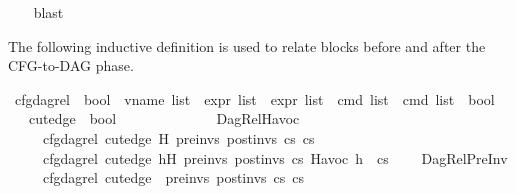 \begin{isabellebody}
\ \ \isamarkupfalse%
\ blast%
\endisatagproof
{\isafoldproof}%
%
\isadelimproof
\isanewline
%
\endisadelimproof
\isanewline
{}\isamarkupfalse%
%
\isadelimdocument
%
\endisadelimdocument
%
\isatagdocument
%
\isamarkuptrue%
%
\endisatagdocument
{\isafolddocument}%
%
\isadelimdocument
%
\endisadelimdocument
%
\begin{isamarkuptext}%
The following inductive definition is used to relate blocks before and after the CFG-to-DAG
phase.%
\end{isamarkuptext}\isamarkuptrue%
\isamarkupfalse%
\ cfg{\isacharunderscore}{\kern0pt}dag{\isacharunderscore}{\kern0pt}rel\ {\isacharcolon}{\kern0pt}{\isacharcolon}{\kern0pt}\ {\isachardoublequoteopen}bool\ {\isasymRightarrow}\ vname\ list\ {\isasymRightarrow}\ expr\ list\ {\isasymRightarrow}\ expr\ list\ {\isasymRightarrow}\ cmd\ list\ {\isasymRightarrow}\ cmd\ list\ {\isasymRightarrow}\ bool{\isachardoublequoteclose}\isanewline
\ \ \ {\isachardoublequoteopen}cut{\isacharunderscore}{\kern0pt}edge{\isachardoublequoteclose}\ {\isacharcolon}{\kern0pt}{\isacharcolon}{\kern0pt}\ bool\isanewline
\ \ \ \ \ \ \ \ \isanewline
\ \ \ \ \ DagRel{\isacharunderscore}{\kern0pt}Havoc{\isacharcolon}{\kern0pt}\isanewline
\ \ \ \ \ {\isachardoublequoteopen}{\isasymlbrakk}cfg{\isacharunderscore}{\kern0pt}dag{\isacharunderscore}{\kern0pt}rel\ cut{\isacharunderscore}{\kern0pt}edge\ H\ pre{\isacharunderscore}{\kern0pt}invs\ post{\isacharunderscore}{\kern0pt}invs\ cs{}\ cs{}{\isasymrbrakk}\ {\isasymLongrightarrow}\isanewline
\ \ \ \ \ cfg{\isacharunderscore}{\kern0pt}dag{\isacharunderscore}{\kern0pt}rel\ cut{\isacharunderscore}{\kern0pt}edge\ {\isacharparenleft}{\kern0pt}h{\isacharhash}{\kern0pt}H{\isacharparenright}{\kern0pt}\ pre{\isacharunderscore}{\kern0pt}invs\ post{\isacharunderscore}{\kern0pt}invs\ cs{}\ {\isacharparenleft}{\kern0pt}Havoc\ h\ {\isacharhash}{\kern0pt}\ cs{}{\isacharparenright}{\kern0pt}{\isachardoublequoteclose}\isanewline
\ \ \ {\isacharbar}{\kern0pt}\ DagRel{\isacharunderscore}{\kern0pt}PreInv{\isacharcolon}{\kern0pt}\isanewline
\ \ \ \ \ {\isachardoublequoteopen}{\isasymlbrakk}cfg{\isacharunderscore}{\kern0pt}dag{\isacharunderscore}{\kern0pt}rel\ cut{\isacharunderscore}{\kern0pt}edge\ {\isacharbrackleft}{\kern0pt}{\isacharbrackright}{\kern0pt}\ pre{\isacharunderscore}{\kern0pt}invs\ post{\isacharunderscore}{\kern0pt}invs\ cs{}\ cs{}{\isasymrbrakk}\ {\isasymLongrightarrow}\isanewline

\end{isabellebody}
